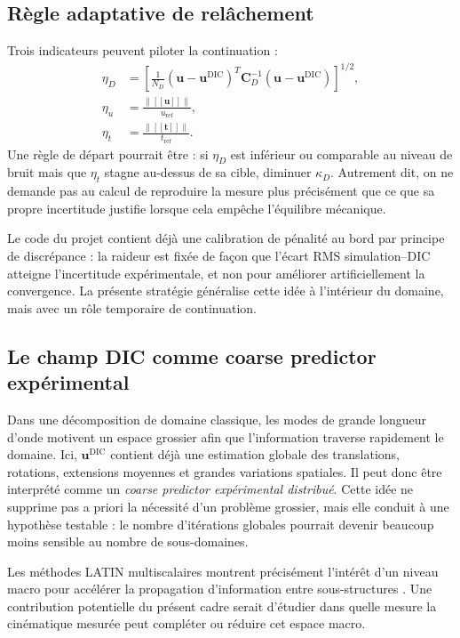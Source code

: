 \documentclass[11pt,a4paper]{article}
\newcommand{\udic}{\bm{u}^{\mathrm{DIC}}}
\newcommand{\jump}[1]{\left[\!\left[ #1 \right]\!\right]}
\begin{document}
\subsection{Règle adaptative de relâchement}

Trois indicateurs peuvent piloter la continuation :
\begin{align}
 \eta_D &= \left[\frac{1}{N_D}(\bm{u}-\udic)^T\bm{C}_D^{-1}(\bm{u}-\udic)\right]^{1/2},\\
 \eta_u &= \frac{\|\jump{\bm{u}}\|}{u_{\mathrm{ref}}},\\
 \eta_t &= \frac{\|\jump{\bm{t}}\|}{t_{\mathrm{ref}}}.
\end{align}
Une règle de départ pourrait être : si $\eta_D$ est inférieur ou comparable au niveau de bruit mais
que $\eta_t$ stagne au-dessus de sa cible, diminuer $\kappa_D$. Autrement dit, on ne demande pas au
calcul de reproduire la mesure plus précisément que ce que sa propre incertitude justifie lorsque
cela empêche l'équilibre mécanique.

Le code du projet contient déjà une calibration de pénalité au bord par principe de discrépance : la
raideur est fixée de façon que l'écart RMS simulation--DIC atteigne l'incertitude expérimentale, et
non pour améliorer artificiellement la convergence. La présente stratégie généralise cette idée à
l'intérieur du domaine, mais avec un rôle temporaire de continuation.

\subsection{Le champ DIC comme coarse predictor expérimental}

Dans une décomposition de domaine classique, les modes de grande longueur d'onde motivent un
espace grossier afin que l'information traverse rapidement le domaine. Ici, $\udic$ contient déjà une
estimation globale des translations, rotations, extensions moyennes et grandes variations spatiales.
Il peut donc être interprété comme un \emph{coarse predictor expérimental distribué}. Cette idée ne
supprime pas a priori la nécessité d'un problème grossier, mais elle conduit à une hypothèse testable :
le nombre d'itérations globales pourrait devenir beaucoup moins sensible au nombre de
sous-domaines.

Les méthodes LATIN multiscalaires montrent précisément l'intérêt d'un niveau macro pour accélérer
la propagation d'information entre sous-structures \parencite{ladeveze2010latin}. Une contribution
potentielle du présent cadre serait d'étudier dans quelle mesure la cinématique mesurée peut
compléter ou réduire cet espace macro.
\end{document}
